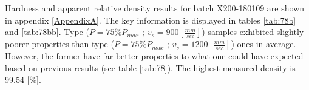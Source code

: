 Hardness and apparent relative density results for batch X200-180109 are shown in appendix \ref{AppendixA}. The key information is displayed in tables \ref{tab:78b} and \ref{tab:78bb}. Type ($P=75\% P_{max}$ ; $v_s=900 [\frac{mm}{sec}]$) samples exhibited slightly poorer properties than type ($P=75\% P_{max}$ ; $v_s=1200 [\frac{mm}{sec}]$) ones in average. However, the former have far better properties to what one could have expected based on previous results (see table \ref{tab:78}). The highest measured density is 99.54 [\%].\\




 \begin{center}
\begin{table}[ht]
\noindent{}

\caption[Average values and standard deviations for apparent relative densities and hardnesses of the specimens of batch X200-180109]{Average values and standard deviations for apparent relative densities and hardnesses of types the specimens of batch X200-180109}
\label{tab:78b}
\end{table}
 \end{center}
 
